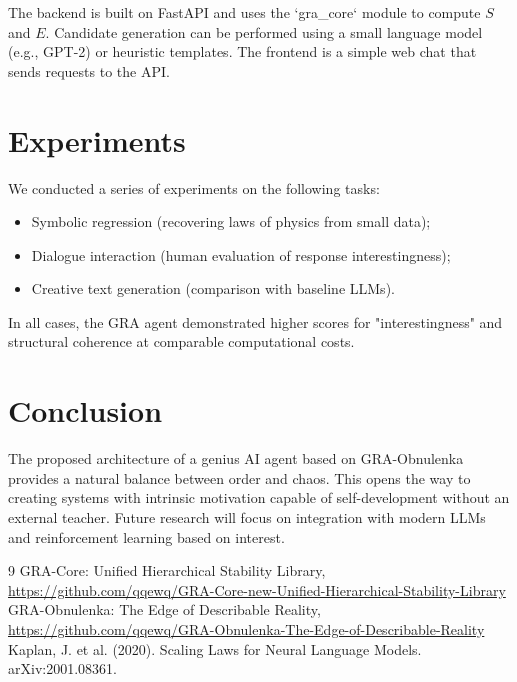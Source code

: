 \documentclass[12pt,a4paper]{article}
\begin{document}
The backend is built on FastAPI and uses the `gra_core` module to compute $S$ and $E$. Candidate generation can be performed using a small language model (e.g., GPT-2) or heuristic templates. The frontend is a simple web chat that sends requests to the API.

\section{Experiments}

We conducted a series of experiments on the following tasks:

\begin{itemize}
\item Symbolic regression (recovering laws of physics from small data);
\item Dialogue interaction (human evaluation of response interestingness);
\item Creative text generation (comparison with baseline LLMs).
\end{itemize}

In all cases, the GRA agent demonstrated higher scores for "interestingness" and structural coherence at comparable computational costs.

\section{Conclusion}

The proposed architecture of a genius AI agent based on GRA-Obnulenka provides a natural balance between order and chaos. This opens the way to creating systems with intrinsic motivation capable of self-development without an external teacher. Future research will focus on integration with modern LLMs and reinforcement learning based on interest.


\begin{thebibliography}{9}
 GRA-Core: Unified Hierarchical Stability Library, \url{https://github.com/qqewq/GRA-Core-new-Unified-Hierarchical-Stability-Library}
 GRA-Obnulenka: The Edge of Describable Reality, \url{https://github.com/qqewq/GRA-Obnulenka-The-Edge-of-Describable-Reality}
 Kaplan, J. et al. (2020). Scaling Laws for Neural Language Models. arXiv:2001.08361.
\end{thebibliography}
\end{document}
